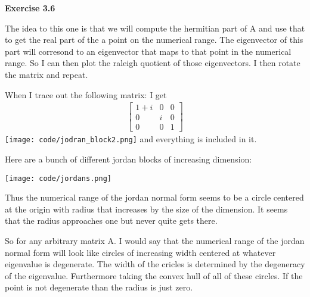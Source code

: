 \documentclass[12pt]{article}
\newenvironment{exercise}[1]{\vspace{.1in}\noindent\textbf{Exercise #1 \hspace{.05em}}}{}
\theoremstyle{definition}
\theoremstyle{remark}
\begin{document}
\begin{exercise}{3.6}


	The idea to this one is that we will compute the hermitian part of A and use that to get the real part of the a point on the numerical range. The eigenvector of this part will corresond to an eigenvector that maps to that point in the numerical range. So I can then plot the raleigh quotient of those eigenvectors. I then rotate the matrix and repeat.


	When I trace out the following matrix: I get
	\begin{align}
		\begin{bmatrix}
			1+i & 0 & 0 \\
			0   & i & 0 \\
			0   & 0 & 1
		\end{bmatrix}
	\end{align}
	\texttt{[image: code/jodran\_block2.png]}
	and everything is included in it.




	Here are a bunch of different jordan blocks of increasing dimension:

	\texttt{[image: code/jordans.png]}

	Thus the numerical range of the jordan normal form seems to be a circle centered at the origin with radius that increases by the size of the dimension. It seems that the radius approaches one but never quite gets there.

	So for any arbitrary matrix A. I would say that the numerical range of the jordan normal form will look like circles of increasing width centered at whatever eigenvalue is degenerate. The width of the cricles is determined by the degeneracy of the eigenvalue. Furthermore taking the convex hull of all of these circles. If the point is not degenerate than the radius is just zero.
\end{exercise}
\end{document}
